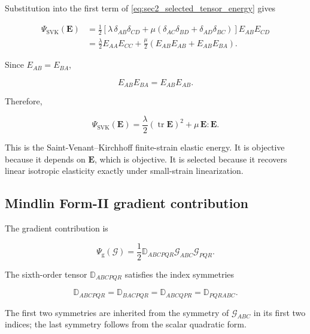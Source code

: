 \documentclass[11pt]{article}
\DeclareMathOperator{\tr}{tr}
\begin{document}
Substitution into the first term of \eqref{eq:sec2_selected_tensor_energy} gives

\begin{align}
\Psi_{\mathrm{SVK}}(\mathbf{E})
&=
\frac{1}{2}
\left[
\lambda\,\delta_{AB}\delta_{CD}
+
\mu\left(
\delta_{AC}\delta_{BD}
+
\delta_{AD}\delta_{BC}
\right)
\right]
E_{AB}E_{CD}
\nonumber\\
&=
\frac{\lambda}{2}E_{AA}E_{CC}
+
\frac{\mu}{2}
\left(
E_{AB}E_{AB}
+
E_{AB}E_{BA}
\right).
\label{eq:sec2_svk_intermediate}
\end{align}

Since $E_{AB}=E_{BA}$,

\begin{equation}
E_{AB}E_{BA}=E_{AB}E_{AB}.
\label{eq:sec2_E_sym_contraction}
\end{equation}

Therefore,

\begin{equation}
\boxed{
\Psi_{\mathrm{SVK}}(\mathbf{E})
=
\frac{\lambda}{2}\left(\tr\mathbf{E}\right)^2
+
\mu\,\mathbf{E}:\mathbf{E}.
}
\label{eq:sec2_svk_energy}
\end{equation}

This is the Saint-Venant--Kirchhoff finite-strain elastic energy. It is objective because it depends on $\mathbf{E}$, which is objective. It is selected because it recovers linear isotropic elasticity exactly under small-strain linearization.

\subsection{Mindlin Form-II gradient contribution}

The gradient contribution is

\begin{equation}
\boxed{
\Psi_{\mathrm{g}}(\bm{\mathcal{G}})
=
\frac{1}{2}\mathbb{D}_{ABCPQR}\mathcal{G}_{ABC}\mathcal{G}_{PQR}.
}
\label{eq:sec2_gradient_energy_tensor}
\end{equation}

The sixth-order tensor $\mathbb{D}_{ABCPQR}$ satisfies the index symmetries

\begin{equation}
\mathbb{D}_{ABCPQR}
=
\mathbb{D}_{BACPQR}
=
\mathbb{D}_{ABCQPR}
=
\mathbb{D}_{PQRABC}.
\label{eq:sec2_D_symmetries}
\end{equation}

The first two symmetries are inherited from the symmetry of $\mathcal{G}_{ABC}$ in its first two indices; the last symmetry follows from the scalar quadratic form.
\end{document}
